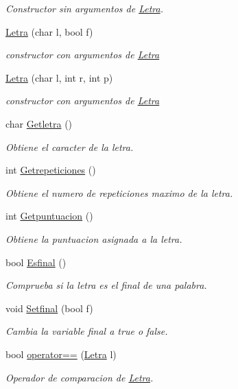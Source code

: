 \begin{DoxyCompactItemize}
\begin{DoxyCompactList}\small\item\em Constructor sin argumentos de \hyperlink{class_letra}{Letra}. \end{DoxyCompactList}\item 
\hyperlink{class_letra_af93c6aaf2572b0d5c6018a2cc725b9ac}{Letra} (char l, bool f)
\begin{DoxyCompactList}\small\item\em constructor con argumentos de \hyperlink{class_letra}{Letra} \end{DoxyCompactList}\item 
\hyperlink{class_letra_a4304daa71fe67908abd35cede2b0a4bb}{Letra} (char l, int r, int p)
\begin{DoxyCompactList}\small\item\em constructor con argumentos de \hyperlink{class_letra}{Letra} \end{DoxyCompactList}\item 
char \hyperlink{class_letra_ae3211a43ab79d91579ec0dcfcb75b406}{Getletra} ()
\begin{DoxyCompactList}\small\item\em Obtiene el caracter de la letra. \end{DoxyCompactList}\item 
int \hyperlink{class_letra_a782eef48654dd647230431c504a64f08}{Getrepeticiones} ()
\begin{DoxyCompactList}\small\item\em Obtiene el numero de repeticiones maximo de la letra. \end{DoxyCompactList}\item 
int \hyperlink{class_letra_a65cf5c62e8e7fd3fb27bfffab9e3e6d4}{Getpuntuacion} ()
\begin{DoxyCompactList}\small\item\em Obtiene la puntuacion asignada a la letra. \end{DoxyCompactList}\item 
bool \hyperlink{class_letra_a05eac9ad5462adecb931fab403218bc0}{Esfinal} ()
\begin{DoxyCompactList}\small\item\em Comprueba si la letra es el final de una palabra. \end{DoxyCompactList}\item 
void \hyperlink{class_letra_a3dc799384426e2194da44ed85580d4f6}{Setfinal} (bool f)
\begin{DoxyCompactList}\small\item\em Cambia la variable final a true o false. \end{DoxyCompactList}\item 
bool \hyperlink{class_letra_ad9d804cc171e1bf2081092d5b3bfd307}{operator==} (\hyperlink{class_letra}{Letra} l)
\begin{DoxyCompactList}\small\item\em Operador de comparacion de \hyperlink{class_letra}{Letra}. \end{DoxyCompactList}\end{DoxyCompactItemize}


